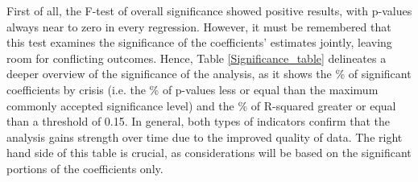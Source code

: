 \documentclass[12pt]{article}
\begin{document}
First of all, the F-test of overall significance showed positive results, with p-values always near to zero in every regression. However, it must be remembered that this test examines the significance of the coefficients' estimates jointly, leaving room for conflicting outcomes. Hence, Table \ref{Significance_table} delineates a deeper overview of the significance of the analysis, as it shows the \% of significant coefficients by crisis (i.e. the \% of p-values less or equal than the maximum commonly accepted significance level) and the \% of R-squared greater or equal than a threshold of 0.15. In general, both types of indicators confirm that the analysis gains strength over time due to the improved quality of data. The right hand side of this table is crucial, as considerations will be based on the significant portions of the coefficients only. \\
\end{document}
